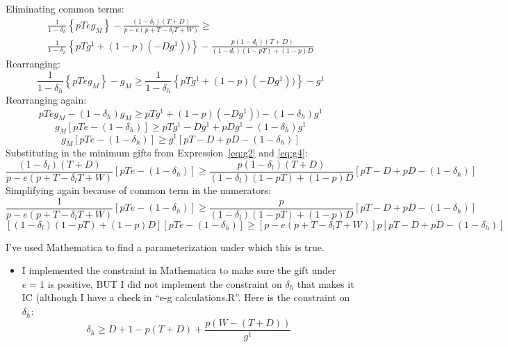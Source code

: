 \documentclass[12pt]{article}
\newcommand{\de}{\delta}
\begin{document}
Eliminating common terms:
	\begin{multline*}
		\frac{1}{1-\de_h}\left\{pTeg_M \right\} - \frac{\left(1 - \de_l \right) \left( T + D \right)}{p - e \left( p + T - \de_l T + W \right)} \geq \\
		\frac{1}{1-\de_h}\left\{pTg^1 + (1-p)(- Dg^1))\right\} - \frac{p(1-d_l)(T+D)}{(1-d_l)(1-pT)+(1-p)D}
	\end{multline*}			
Rearranging:
	\begin{equation*}
		\frac{1}{1-\de_h}\left\{pTeg_M \right\} - g_M \geq \frac{1}{1-\de_h}\left\{pTg^1 + (1-p)(- Dg^1))\right\} - g^1
	\end{equation*}		
Rearranging again:
	\begin{equation*}
		pTeg_M - \left(1-\de_h\right)g_M \geq pTg^1 + (1-p)(- Dg^1)) - \left(1-\de_h\right)g^1
	\end{equation*}	
	\begin{equation*}
		g_M\left[pTe - \left(1-\de_h\right)\right] \geq pTg^1 -Dg^1 + pDg^1 - \left(1-\de_h\right)g^1
	\end{equation*}
	\begin{equation*}
		g_M\left[pTe - \left(1-\de_h\right)\right] \geq g^1\left[pT - D + pD - \left(1-\de_h\right)\right]
	\end{equation*}	
Substituting in the minimum gifts from Expression~\ref{eq:g2} and \ref{eq:g4}:				
	\begin{equation*}
		\frac{\left(1 - \de_l \right) \left( T + D \right)}{p - e \left( p + T - \de_l T + W \right)} \left[pTe - \left(1-\de_h\right)\right] \geq \frac{p(1-\de_l)(T + D)}{\left(1-\de_l \right)(1-pT) +(1-p)D} \left[pT - D + pD - \left(1-\de_h\right)\right]
	\end{equation*}	
Simplifying again because of common term in the numerators:
	\begin{equation*}
		\frac{1}{p - e \left( p + T - \de_l T + W \right)} \left[pTe - \left(1-\de_h\right)\right] \geq \frac{p}{\left(1-\de_l \right)(1-pT) +(1-p)D} \left[pT - D + pD - \left(1-\de_h\right)\right]
	\end{equation*}	
		\begin{equation*}
		\left[\left(1-\de_l \right)(1-pT) +(1-p)D\right] \left[pTe - \left(1-\de_h\right)\right] \geq \left[p - e \left( p + T - \de_l T + W \right)\right]p \left[pT - D + pD - \left(1-\de_h\right)\right]
	\end{equation*}	
	
I've used Mathematica to find a parameterization under which this is true.
\begin{itemize}
	\item I implemented the constraint in Mathematica to make sure the gift under $e=1$ is positive, BUT I did not implement the constraint on $\de_h$ that makes it IC (although I have a check in ``e-g calculations.R''. Here is the constraint on $\de_h$:
		\[
		  \de_h \geq D + 1 - p(T+D) + \frac{p(W-(T+D))}{g^1}
		\]
\end{itemize}
\end{document}
